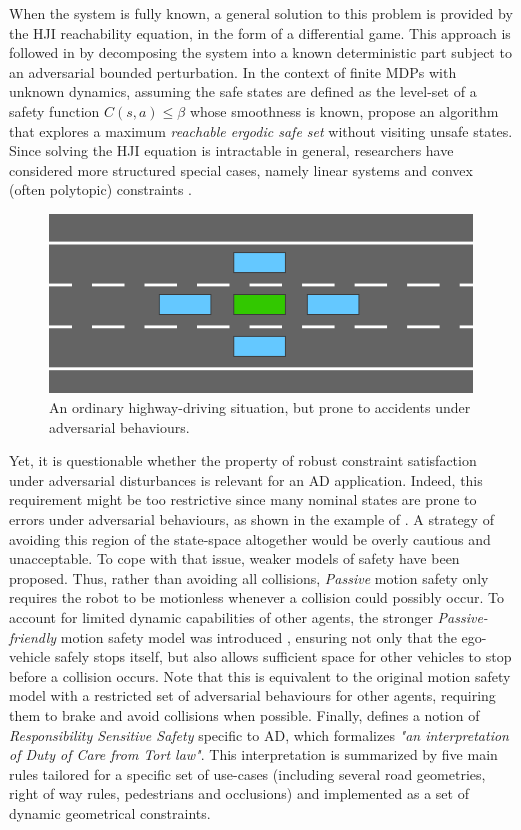 When the system is fully known, a general solution to this problem is provided by the \ac{HJI} reachability equation, in the form of a differential game. This approach is followed in \citep{leung2018infusing,Fisac2019} by decomposing the system into a known deterministic part subject to an adversarial bounded perturbation. In the context of finite \acp*{MDP} with unknown dynamics, 
assuming the safe states are defined as the level-set of a safety function  $C(s,a) \leq \beta$ whose smoothness is known, \citet{Turchetta2016} propose an algorithm that explores a maximum \emph{reachable ergodic safe set} without visiting unsafe states.
Since solving the \ac*{HJI} equation is intractable in general, researchers have considered more structured special cases, namely linear systems and convex (often polytopic) constraints \citep{Fukushima2007,Adetola2009,Aswani2013,Lorenzen2017,Kohler2019,Lu2019}.

\begin{figure}[ht]
	\centering
	\includegraphics[width=0.45\linewidth]{img/safety_no_2_small}
	\caption{An ordinary highway-driving situation, but prone to accidents under adversarial behaviours.}
	\label{fig:no-safety}
\end{figure}
Yet, it is questionable whether the property of robust constraint satisfaction under adversarial disturbances is relevant for an \acl*{AD} application. Indeed, this requirement might be too restrictive since many nominal states are prone to errors under adversarial behaviours, as shown in the example of . A strategy of avoiding this region of the state-space altogether would be overly cautious and unacceptable. To cope with that issue, weaker models of safety have been proposed. Thus, rather than avoiding all collisions, \emph{Passive} motion safety \citep{Macek2009,Bouraine2012,Bouraine2014} only requires the robot to be motionless whenever a collision could possibly occur. To account for limited dynamic capabilities of other agents, the stronger \emph{Passive-friendly} motion safety model was introduced \citep{Mitsch2017}, ensuring not only that the ego-vehicle safely stops itself, but also allows sufficient space for other vehicles to stop before a collision occurs. Note that this is equivalent to the original motion safety model with a restricted set of adversarial behaviours for other agents, requiring them to brake and avoid collisions when possible. Finally, \citet{ShalevShwartz2017} defines a notion of \emph{Responsibility Sensitive Safety} specific to \acl*{AD}, which formalizes \emph{"an interpretation of \emph{Duty of Care} from Tort law"}. This interpretation is summarized by five main rules tailored for a specific set of use-cases (including several road geometries, right of way rules, pedestrians and occlusions) and implemented as a set of dynamic geometrical constraints.

